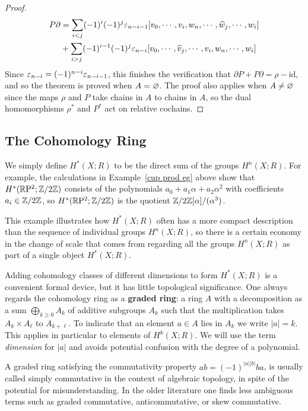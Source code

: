 \begin{proof}
\begin{align*}
P\partial&=\sum_{i<j}(-1)^i(-1)^j\varepsilon_{n-i-1}[v_0,\cdots,v_i,w_n,\cdots,\widehat{w}_j,\cdots,w_i]\\
&+\sum_{i>j}(-1)^{i-1}(-1)^j\varepsilon_{n-i}[v_0,\cdots,\widehat{v}_j,\cdots,v_i,w_n,\cdots,w_i]
\end{align*}
Since $\varepsilon_{n-i}=(-1)^{n-i}\varepsilon_{n-i-1}$, this finishes the verification that $\partial P+P\partial=\rho-\mathrm{id}$, and so the theorem is proved when $A=\varnothing$. The proof also applies when $A\neq\varnothing$ since the maps $\rho$ and $P$ take chains in $A$ to chains in $A$, so the dual homomorphisms $\rho^*$ and
$P^*$ act on relative cochains.
\end{proof}
\subsection{The Cohomology Ring}
We simply define $H^*(X;R)$ to be the direct sum of the groups $H^n(X;R)$. For example, the calculations in Example~\ref{cup prod eg} above show that $H^*(\mathbb{R}\mathrm{P}^2;\mathbb{Z}/2\mathbb{Z})$ consists of the polynomials $a_0+a_1\alpha+a_2\alpha^2$ with coefficients $a_i\in\mathbb{Z}/2\mathbb{Z}$, so $H^*(\mathbb{R}\mathrm{P}^2;\mathbb{Z}/2\mathbb{Z})$ is the quotient $\mathbb{Z}/2\mathbb{Z}[\alpha]/(\alpha^3)$.\par
This example illustrates how $H^*(X;R)$ often has a more compact description
than the sequence of individual groups $H^n(X;R)$, so there is a certain economy in the change of scale that comes from regarding all the groups $H^n(X;R)$ as part of a single object $H^*(X;R)$.\par
Adding cohomology classes of different dimensions to form $H^*(X;R)$ is a convenient formal device, but it has little topological significance. One always regards the cohomology ring as a \textbf{graded ring}: a ring $A$ with a decomposition as a sum $\bigoplus_{k\geq 0}A_k$ of additive subgroups $A_k$ such that the multiplication takes $A_k\times A_\ell$ to $A_{k+\ell}$. To indicate that an element $a\in A$ lies in $A_k$ we write $|a|=k$. This applies in particular to elements of $H^k(X;R)$. We will use the term \textit{dimension} for $|a|$ and avoids potential confusion with the degree of a polynomial.\par
A graded ring satisfying the commutativity property $ab=(-1)^{|a||b|}ba$, is usually called simply commutative in the context of algebraic topology, in spite of the potential for misunderstanding. In the older literature one finds
less ambiguous terms such as graded commutative, anticommutative, or skew commutative.
